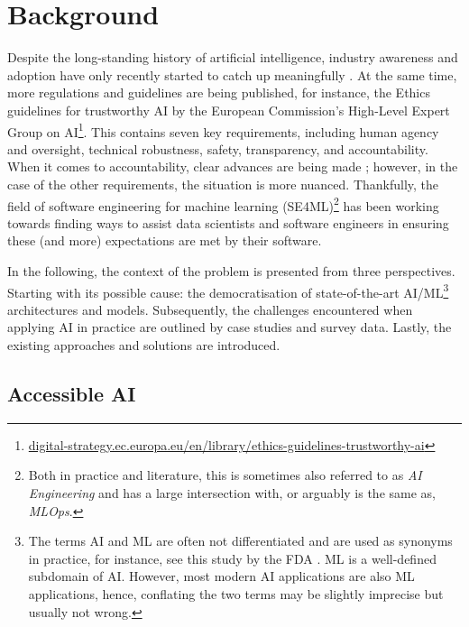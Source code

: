 \chapter{Background} \label{chapter:background}

Despite the long-standing history of artificial intelligence, industry awareness and adoption have only recently started to catch up meaningfully \cite{wirtz2019artificial}. At the same time, more regulations and guidelines are being published, for instance, the Ethics guidelines for trustworthy AI by the European Commission's High-Level Expert Group on AI\footnote{\href{https://digital-strategy.ec.europa.eu/en/library/ethics-guidelines-trustworthy-ai}{digital-strategy.ec.europa.eu/en/library/ethics-guidelines-trustworthy-ai}}. This contains seven key requirements, including human agency and oversight, technical robustness, safety, transparency, and accountability. When it comes to accountability, clear advances are being made \cite{raji2020closing}; however, in the case of the other requirements, the situation is more nuanced. Thankfully, the field of software engineering for machine learning (SE4ML)\footnote{Both in practice and literature, this is sometimes also referred to as \textit{AI Engineering} and has a large intersection with, or arguably is the same as, \textit{MLOps}.} has been working towards finding ways to assist data scientists and software engineers in ensuring these (and more) expectations are met by their software.

In the following, the context of the problem is presented from three perspectives. Starting with its possible cause: the democratisation of state-of-the-art AI/ML\footnote{The terms AI and ML are often not differentiated and are used as synonyms in practice, for instance, see this study by the FDA \cite{food2019proposed}. ML is a well-defined subdomain of AI. However, most modern AI applications are also ML applications, hence, conflating the two terms may be slightly imprecise but usually not wrong.} architectures and models. Subsequently, the challenges encountered when applying AI in practice are outlined by case studies and survey data. Lastly, the existing approaches and solutions are introduced.

\section{Accessible AI} \label{section:accessible-ai}

